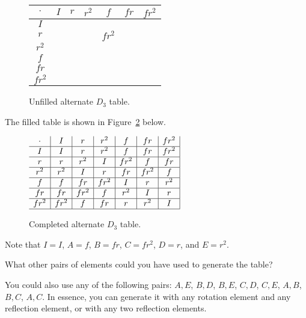 \documentclass[../gatm_answers.tex]{subfiles}
\begin{document}
\begin{figure}[h]
\begin{center}
\begin{tabular}{c|c|c|c|c|c|c|}
$\cdot$ & $I$ & $r$ & $r^2$ & $f$ & $fr$ & $fr^2$ \\ \hline
$I$    &   &   &   &   &   &   \\ \hline
$r$    &   &   &   & $fr^2$  &   &   \\ \hline
$r^2$    &   &   &   &   &   &   \\ \hline
$f$    &   &   &   &   &   &   \\ \hline
$fr$    &   &   &   &   &   &   \\ \hline
$fr^2$    &   &   &   &   &   &   \\ \hline
\end{tabular}
\end{center}
\caption{Unfilled alternate $D_3$ table.}
\label{fig:alttable}
\end{figure}

The filled table is shown in Figure~\ref{fig:filled_alttable} below.

\begin{figure}[h]
\begin{center}
$\begin{array}{c|c|c|c|c|c|c|}
\cdot & I & r & r^2 & f & fr & fr^2 \\ \hline
I & I & r & r^2 & f & fr & fr^2 \\ \hline
r & r & r^2 & I & fr^2 & f & fr \\ \hline
r^2 & r^2 & I & r & fr & fr^2 & f \\ \hline
f & f & fr & fr^2 & I & r & r^2 \\ \hline
fr & fr & fr^2 & f & r^2 & I & r \\ \hline
fr^2 & fr^2 & f & fr & r & r^2 & I \\ \hline
\end{array}$
\end{center}
\caption{Completed alternate $D_3$ table.}
\label{fig:filled_alttable}
\end{figure}

Note that $I=I$, $A=f$, $B=fr$, $C=fr^2$, $D=r$, and $E=r^2$.

\begin{outer_problem}
\item What other pairs of elements could you have used to generate the table?
\end{outer_problem}

You could also use any of the following pairs: ${A,E}$, ${B,D}$, ${B,E}$, ${C,D}$, ${C,E}$, ${A,B}$, ${B,C}$, ${A,C}$. In essence, you can generate it with any rotation element and any reflection element, or with any two reflection elements.
\end{document}

